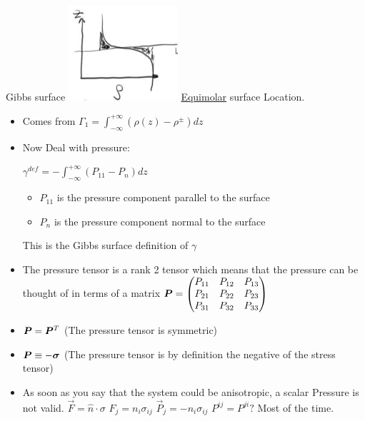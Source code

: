 \documentclass{article}
\begin{document}
\begin{section}
  {Gibbs surface}
  \includegraphics[height=100pt]{Day4NotesPics/gibbsSurface}
  \underline{Equimolar} surface Location.
  \begin{itemize}
    \item Comes from $\Gamma_1 = \int_{-\infty}^{+\infty}(\rho(z)-\rho^\pm)dz$
    \item  Now Deal with pressure:

    $\gamma^{def} = - \int_{-\infty}^{+\infty} (P_{11} - P_n) d z$
    \begin{itemize}
      \item $P_{11}$ is the pressure component parallel to the surface
      \item $P_n$ is the pressure component normal to the surface
    \end{itemize}

    This is the Gibbs surface definition of $\gamma$

    \item  The pressure tensor is a rank 2 tensor which means that the pressure can be thought of in terms of a matrix 
      $\bm{P} = \begin{pmatrix}
	P_{11} & P_{12} & P_{13} \\
	P_{21} & P_{22} & P_{23} \\
	P_{31} & P_{32} & P_{33} 
    \end{pmatrix}$
  \item $\bm{P} = \bm{P}^T$ (The pressure tensor is symmetric)
  \item $\bm{P} \equiv - \bm{\sigma}$
    (The pressure tensor is by definition the negative of the stress tensor)
    \item As soon as you say that the system could be anisotropic, a scalar Pressure is not valid.
    $\vec{F} = \hat{n}\cdot \sigma$
    $F_j = n_i \sigma_{ij}$
    $\vec{P}_j = - n_i \sigma_{ij}$
    $P^{ij} = P^{ji}?$ Most of the time.
  \end{itemize}
\end{section}
\end{document}

